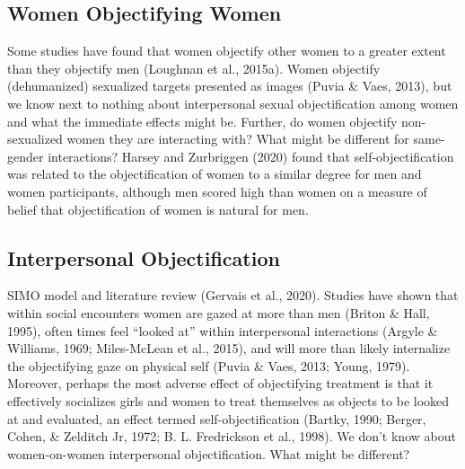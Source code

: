 \documentclass[man]{apa6}
\begin{document}
\subsection{Women Objectifying Women}\label{women-objectifying-women}

Some studies have found that women objectify other women to a greater
extent than they objectify men (Loughnan et al., 2015a). Women objectify
(dehumanized) sexualized targets presented as images (Puvia \& Vaes,
2013), but we know next to nothing about interpersonal sexual
objectification among women and what the immediate effects might be.
Further, do women objectify non-sexualized women they are interacting
with? What might be different for same-gender interactions? Harsey and
Zurbriggen (2020) found that self-objectification was related to the
objectification of women to a similar degree for men and women
participants, although men scored high than women on a measure of belief
that objectification of women is natural for men.

\subsection{Interpersonal
Objectification}\label{interpersonal-objectification}

SIMO model and literature review (Gervais et al., 2020). Studies have
shown that within social encounters women are gazed at more than men
(Briton \& Hall, 1995), often times feel \enquote{looked at} within
interpersonal interactions (Argyle \& Williams, 1969; Miles-McLean et
al., 2015), and will more than likely internalize the objectifying gaze
on physical self (Puvia \& Vaes, 2013; Young, 1979). Moreover, perhaps
the most adverse effect of objectifying treatment is that it effectively
socializes girls and women to treat themselves as objects to be looked
at and evaluated, an effect termed self-objectification (Bartky, 1990;
Berger, Cohen, \& Zelditch Jr, 1972; B. L. Fredrickson et al., 1998). We
don't know about women-on-women interpersonal objectification. What
might be different?
\end{document}
